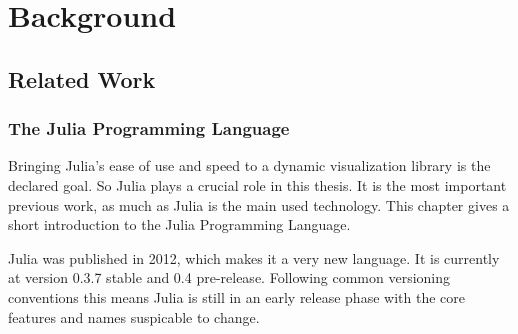 \section{Background}


\subsection{Related Work}

\subsubsection{The Julia Programming Language}
Bringing Julia's ease of use and speed to a dynamic visualization library is the declared goal.
So Julia plays a crucial role in this thesis. 
It is the most important previous work, as much as Julia is the main used technology.
This chapter gives a short introduction to the Julia Programming Language.

Julia was published in 2012, which makes it a very new language. It is currently at version 0.3.7 stable and 0.4 pre-release.
Following common versioning conventions this means Julia is still in an early release phase with the core features and names suspicable to change.

